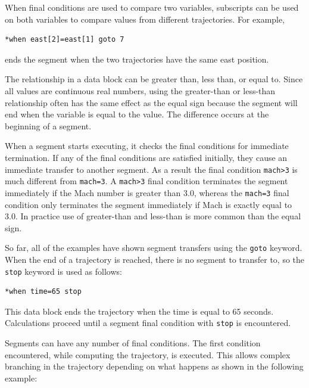 When final conditions are used to compare two variables, subscripts can be used on
both variables to compare values from different trajectories. For example,

\begin{lstlisting}[style=taosmanual]
*when east[2]=east[1] goto 7
\end{lstlisting}

ends the segment when the two trajectories have the same east position.


The relationship in a  data block can be greater than, less
than, or equal to. Since all values are continuous real numbers, using the greater-than
or less-than relationship often has the same effect as the equal sign because the
segment will end when the variable is equal to the value. The difference occurs at
the beginning of a segment.

When a segment starts executing, it checks the final conditions for immediate
termination. If any of the final conditions are satisfied initially, they cause an
immediate transfer to another segment. As a result the final condition
\texttt{mach>3} is much different from \texttt{mach=3}. A \texttt{mach>3} final
condition terminates the segment immediately if the Mach number is greater than
3.0, whereas the \texttt{mach=3} final condition only terminates the segment
immediately if Mach is exactly equal to 3.0. In practice use of greater-than and
less-than is more common than the equal sign.


So far, all of the examples have shown segment transfers using the \texttt{goto}
keyword. When the end of a trajectory is reached, there is no segment to transfer to,
so the \texttt{stop} keyword is used as follows:

\begin{lstlisting}[style=taosmanual]
*when time=65 stop
\end{lstlisting}

This data block ends the trajectory when the time is equal to 65 seconds.
Calculations proceed until a segment final condition with \texttt{stop} is
encountered.


Segments can have any number of final conditions. The first condition encountered,
while computing the trajectory, is executed. This allows complex branching in the
trajectory depending on what happens as shown in the following example:

